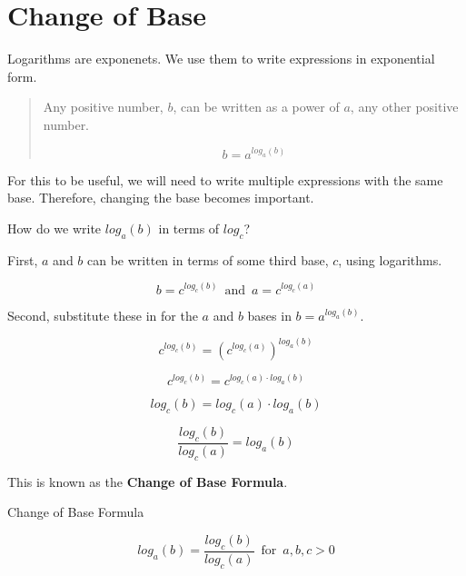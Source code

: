 \documentclass{ximera}
\begin{document}
\section{Change of Base}


Logarithms are exponenets.  We use them to write expressions in exponential form.



\begin{quote}

Any positive number, $b$, can be written as a power of $a$, any other positive number.

\[    b = a^{log_a(b)}  \]

\end{quote}

For this to be useful, we will need to write multiple expressions with the same base. Therefore, changing the base becomes important.

How do we write $log_a(b)$ in terms of $log_c$?




First, $a$ and $b$ can be written in terms of some third base, $c$, using logarithms.


\[    b = c^{log_c(b)} \,   \text{ and } \,      a = c^{log_c(a)}      \]



Second, substitute these in for the $a$ and $b$ bases in $b = a^{log_a(b)}$.



\[   c^{log_c(b)} = \left(c^{log_c(a)}\right)^{log_a(b)}  \]



\[   c^{log_c(b)} = c^{log_c(a) \cdot log_a(b)}  \]



\[   log_c(b) = log_c(a) \cdot log_a(b)  \]


\[   \frac{log_c(b)}{log_c(a)} =  log_a(b)  \]


This is known as the \textbf{Change of Base Formula}.








\begin{template}  Change of Base Formula

\[   log_a(b)  =  \frac{log_c(b)}{log_c(a)}        \, \text{ for } \, a, b, c  > 0        \]


\end{template}
\end{document}
